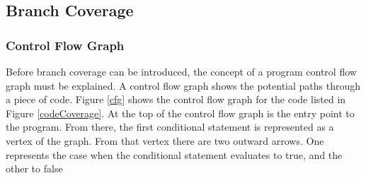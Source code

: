 \subsection{Branch Coverage}

\subsubsection{Control Flow Graph}

Before branch coverage can be introduced, the concept of a program control flow graph must be explained. A control flow graph shows the potential paths through a piece of code. Figure \ref{cfg} shows the control flow graph for the code listed in Figure \ref{codeCoverage}. At the top of the control flow graph is the entry point to the program. From there, the first conditional statement is represented as a vertex of the graph. From that vertex there are two outward arrows. One represents the case when the conditional statement evaluates to true, and the other to false \citep{Myers:2004:AST:983238}


